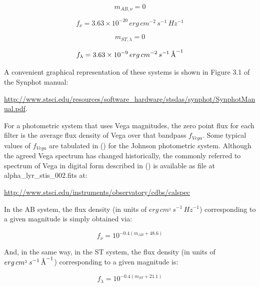 \documentclass[11pt,a4paper]{ivoa}
\newcommand{\angstrom}{\mbox{\normalfont\AA}}
\begin{document}
\begin{equation} \label{eq:7}
m_{AB,\nu } = 0
\end{equation}

\begin{equation} \label{eq:8}
f_\nu = 3.63\times 10^{-20}\,erg\,cm^{-2}\,s^{-1}\,Hz^{-1}
\end{equation}

\begin{equation} \label{eq:9}
m_{ST,\lambda } = 0
\end{equation}

\begin{equation} \label{eq:10}
f_\lambda = 3.63\times 10^{-9}\,erg\,cm^{-2}\,s^{-1}\,\angstrom^{-1}
\end{equation}


A convenient graphical representation of these systems is shown in 
Figure 3.1 of the Synphot manual:

\url{http://www.stsci.edu/resources/software_hardware/stsdas/synphot/SynphotManual.pdf}.
\par

For a photometric system that uses Vega magnitudes, the zero point 
flux for each filter is the average flux density of Vega over that 
bandpass $f_{Vega}$. Some typical values of $f_{Vega}$ are tabulated in 
(\citep{2001eaa..book.....M}) for the Johnson photometric system. Although 
the agreed Vega spectrum has changed historically, the commonly referred to 
spectrum of Vega in digital form described in (\citep{2004AJ....127.3508B}) 
is available as file at alpha\_lyr\_stis\_002.fits at:\par
\url{http://www.stsci.edu/instruments/observatory/cdbs/calspec}
\par

In the AB system, the flux density (in units of $erg\, cm^{_2}\, s^{-1}\, Hz^{-1}$) 
corresponding to a given magnitude is simply obtained via:

\begin{equation} \label{eq:11}
f_{\nu} = 10^{-0.4(m_{AB}+48.6)}
\end{equation}

And, in the same way, in the ST system, the flux density (in units of $erg\, 
cm^{_2}\, s^{-1}\, \angstrom^{-1}$) corresponding to a given magnitude is:

\begin{equation} \label{eq:12}
f_{\lambda} = 10^{-0.4(m_{ST}+21.1)}
\end{equation}
\end{document}
